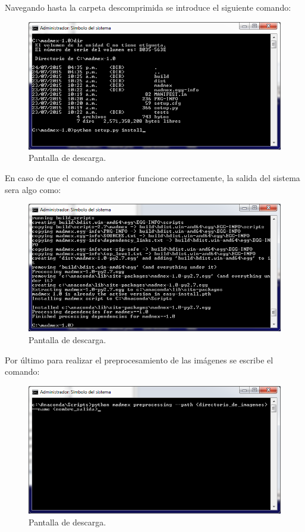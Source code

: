 \documentclass[11pt, spanish]{memoir}
\begin{document}
Navegando hasta la carpeta descomprimida
se introduce el siguiente comando:

\begin{figure}[H]
\centering
\includegraphics[width=14cm]{command2.png}
\caption{Pantalla de descarga. \label{overflow}}
\end{figure}
En caso de que el comando anterior funcione correctamente, la salida del sistema sera
 algo como:
\begin{figure}[H]
\centering
\includegraphics[width=14cm]{command3.png}
\caption{Pantalla de descarga. \label{overflow}}
\end{figure}

Por último para realizar el preprocesamiento de las imágenes se escribe el comando:

\begin{figure}[H]
\centering
\includegraphics[width=14cm]{command4.png}
\caption{Pantalla de descarga. \label{overflow}}
\end{figure}
\end{document}
